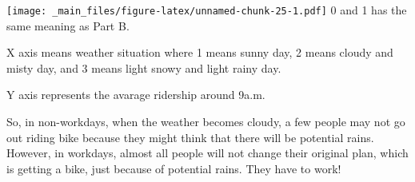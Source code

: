\documentclass[
]{article}
\begin{document}
\texttt{[image: \_main\_files/figure-latex/unnamed-chunk-25-1.pdf]}
0 and 1 has the same meaning as Part B.

X axis means weather situation where 1 means sunny day, 2 means cloudy and misty day, and 3 means light snowy and light rainy day.

Y axis represents the avarage ridership around 9a.m.

So, in non-workdays, when the weather becomes cloudy, a few people may not go out riding bike because they might think that there will be potential rains. However, in workdays, almost all people will not change their original plan, which is getting a bike, just because of potential rains. They have to work!

  
\end{document}
